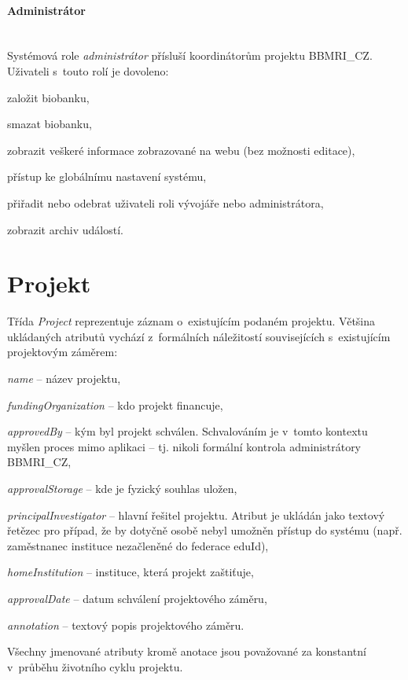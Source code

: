 \documentclass[11pt, draft, oneside]{fithesis2}
\newcommand{\paragraphNewLine}[1]{\paragraph*{#1}\mbox{}\\}
\newcommand{\ProjectName}{\mbox{BBMRI\_CZ}\xspace}
\begin{document}
\paragraphNewLine{Administrátor}
Systémová role \textit{administrátor} přísluší koordinátorům projektu \ProjectName.
Uživateli s~touto rolí je dovoleno:
\begin{compactitem}
	\item založit biobanku, 
	\item smazat biobanku,
	\item zobrazit veškeré informace zobrazované na webu (bez možnosti editace),
	\item přístup ke globálnímu nastavení systému,
	\item přiřadit nebo odebrat uživateli roli vývojáře nebo administrátora,
	\item zobrazit archiv událostí.
\end{compactitem}

\section{Projekt}
Třída \textit{Project} reprezentuje záznam o~existujícím podaném projektu. Většina ukládaných atributů vychází z~formálních náležitostí souvisejících s~existujícím projektovým záměrem:
\begin{compactitem}
	\item \textit{name} -- název projektu,
	\item \textit{fundingOrganization} -- kdo projekt financuje,	
	\item \textit{approvedBy} -- kým byl projekt schválen. Schvalováním je v~tomto kontextu myšlen proces mimo aplikaci -- tj. nikoli formální kontrola administrátory \ProjectName,
	\item \textit{approvalStorage} -- kde je fyzický souhlas uložen,
	\item \textit{principalInvestigator} -- hlavní řešitel projektu. Atribut je ukládán jako textový řetězec pro případ, že by dotyčně osobě nebyl umožněn přístup do systému (např. zaměstnanec instituce nezačleněné do federace eduId),
	\item \textit{homeInstitution} -- instituce, která projekt zaštiťuje,
	\item \textit{approvalDate} -- datum schválení projektového záměru,
	\item \textit{annotation} -- textový popis projektového záměru.
\end{compactitem}
Všechny jmenované atributy kromě anotace jsou považované za konstantní v~průběhu životního cyklu projektu. 
\end{document}
